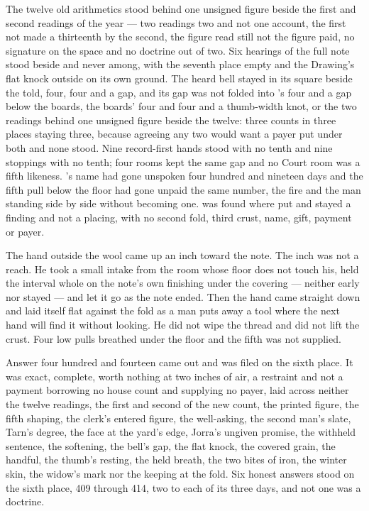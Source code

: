 The twelve old arithmetics stood behind one unsigned figure beside the first and second readings of the year --- two readings two and not one account, the first not made a thirteenth by the second, the figure read still not the figure paid, no signature on the space and no doctrine out of two. Six hearings of the full note stood beside and never among, with the seventh place empty and the Drawing's flat knock outside on its own ground. The heard bell stayed in its square beside the told, four, four and a gap, and its gap was not folded into 's four and a gap below the boards, the boards' four and four and a thumb-width knot, or the two readings behind one unsigned figure beside the twelve: three counts in three places staying three, because agreeing any two would want a payer put under both and none stood. Nine record-first hands stood with no tenth and nine stoppings with no tenth; four rooms kept the same gap and no Court room was a fifth likeness. 's name had gone unspoken four hundred and nineteen days and the fifth pull below the floor had gone unpaid the same number, the fire and the man standing side by side without becoming one.  was found where put and stayed a finding and not a placing, with no second fold, third crust, name, gift, payment or payer.

The hand outside the wool came up an inch toward the note. The inch was not a reach. He took a small intake from the room whose floor does not touch his, held the interval whole on the note's own finishing under the covering --- neither early nor stayed --- and let it go as the note ended. Then the hand came straight down and laid itself flat against the fold as a man puts away a tool where the next hand will find it without looking. He did not wipe the thread and did not lift the crust. Four low pulls breathed under the floor and the fifth was not supplied.

Answer four hundred and fourteen came out and was filed on the sixth place. It was exact, complete, worth nothing at two inches of air, a restraint and not a payment borrowing no house count and supplying no payer, laid across neither the twelve readings, the first and second of the new count, the printed figure, the fifth shaping, the clerk's entered figure, the well-asking, the second man's slate, Tarn's degree, the face at the yard's edge, Jorra's ungiven promise, the withheld sentence, the softening, the bell's gap, the flat knock, the covered grain, the handful, the thumb's resting, the held breath, the two bites of iron, the winter skin, the widow's mark nor the keeping at the fold. Six honest answers stood on the sixth place, 409 through 414, two to each of its three days, and not one was a doctrine.

